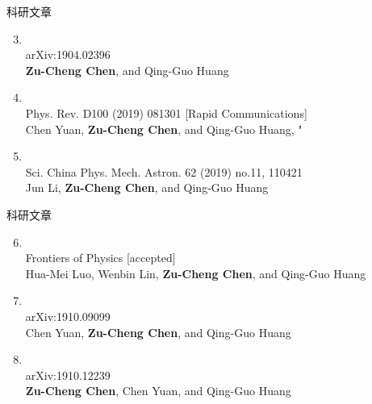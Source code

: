 \documentclass[xcolor=dvipsnames]{beamer} %
\begin{document}
\begin{frame}{科研文章}
    \begin{enumerate}[<+->]    
    \setcounter{enumi}{2}
    \item {}\\ 
    arXiv:1904.02396\\
    \textbf{Zu-Cheng Chen}, and Qing-Guo Huang
    \vspace{2mm}
    
    \item {}\\
    Phys. Rev. D100 (2019) 081301 [Rapid Communications]\\
    Chen Yuan, \textbf{Zu-Cheng Chen}, and Qing-Guo Huang, "
    \vspace{2mm}
     
    \item {}\\
    Sci. China Phys. Mech. Astron. 62 (2019) no.11, 110421\\
    Jun Li, \textbf{Zu-Cheng Chen}, and Qing-Guo Huang
    \vspace{2mm}
\end{enumerate} 
\end{frame}

\begin{frame}{科研文章}
    \begin{enumerate}[<+->]    
    \setcounter{enumi}{5}    
    \item {}\\
    Frontiers of Physics [accepted]\\
    Hua-Mei Luo, Wenbin Lin, \textbf{Zu-Cheng Chen}, and Qing-Guo Huang
    \vspace{2mm}
    
    \item {}\\
    arXiv:1910.09099 \\
    Chen Yuan, \textbf{Zu-Cheng Chen}, and Qing-Guo Huang
    \vspace{2mm}
    
    \item {}\\
    arXiv:1910.12239 \\
    \textbf{Zu-Cheng Chen}, Chen Yuan, and Qing-Guo Huang
\end{enumerate} 
\end{frame}
\end{document}
